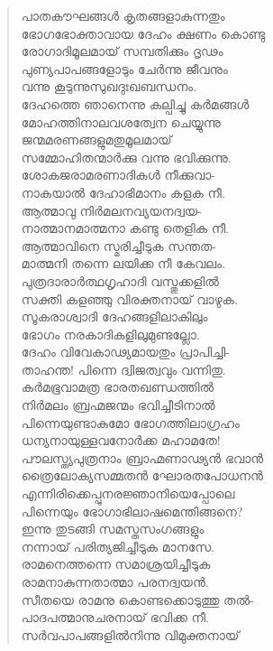 \begin{verse}
പാതകൗഘങ്ങള്‍ കൃതങ്ങളാകുന്നതും\\
ഭോഗഭോക്താവായ ദേഹം ക്ഷണം കൊണ്ടു\\
രോഗാദിമൂലമായ് സമ്പതിക്കും ദൃഢം\\
പുണ്യപാപങ്ങളോടും ചേര്‍ന്നു ജീവനും\\
വന്നു കൂടുന്നുസുഖദുഃഖബന്ധനം.\\
ദേഹത്തെ ഞാനെന്നു കല്പിച്ചു കര്‍മങ്ങള്‍\\
മോഹത്തിനാലവശത്വേന ചെയ്യുന്നു\\
ജന്മമരണങ്ങളുമതുമൂലമായ്\\
സമ്മോഹിതന്മാര്‍ക്കു വന്നു ഭവിക്കുന്നു.\\
ശോകജരാമരണാദികള്‍ നീക്കുവാ-\\
നാകയാല്‍ ദേഹാഭിമാനം കളക നീ.\\
ആത്മാവു നിര്‍മലനവ്യയനദ്വയ-\\
നാത്മാനമാത്മനാ കണ്ടു തെളിക നീ.\\
ആത്മാവിനെ സ്മരിച്ചീടുക സന്തത-\\
മാത്മനി തന്നെ ലയിക്ക നീ കേവലം.\\
പുത്രദാരാര്‍ത്ഥഗൃഹാദി വസ്തുക്കളില്‍\\
സക്തി കളഞ്ഞു വിരക്തനായ് വാഴുക.\\
സൂകരാശ്വാദി ദേഹങ്ങളിലാകിലും\\
ഭോഗം നരകാദികളിലുമുണ്ടല്ലോ.\\
ദേഹം വിവേകാഢ്യമായതും പ്രാപിച്ചി-\\
താഹന്ത! പിന്നെ ദ്വിജത്വവും വന്നിതു.\\
കര്‍മഭൂവാമത്ര ഭാരതഖണ്ഡത്തില്‍\\
നിര്‍മലം ബ്രഹ്മജന്മം ഭവിച്ചീടിനാല്‍\\
പിന്നെയുണ്ടാകുമോ ഭോഗത്തിലാഗ്രഹം\\
ധന്യനായുള്ളവനോര്‍ക്ക മഹാമതേ!\\
പൗലസ്ത്യപുത്രനാം ബ്രാഹ്മണാഢ്യന്‍ ഭവാന്‍\\
ത്രൈലോക്യസമ്മതന്‍ ഘോരതപോധനന്‍\\
എന്നിരിക്കെപ്പുനരജ്ഞാനിയെപ്പോലെ\\
പിന്നെയും ഭോഗാഭിലാഷമെന്തിങ്ങനെ?\\
ഇന്നു തുടങ്ങി സമസ്തസംഗങ്ങളും\\
നന്നായ് പരിത്യജിച്ചീടുക മാനസേ.\\
രാമനെത്തന്നെ സമാശ്രയിച്ചീടുക\\
രാമനാകുന്നതാത്മാ പരനദ്വയന്‍.\\
സീതയെ രാമനു കൊണ്ടക്കൊടുത്തു തല്‍-\\
പാദപത്മാനുചരനായ് ഭവിക്ക നീ.\\
സര്‍വപാപങ്ങളില്‍നിന്നു വിമുക്തനായ്\\

\end{verse}
